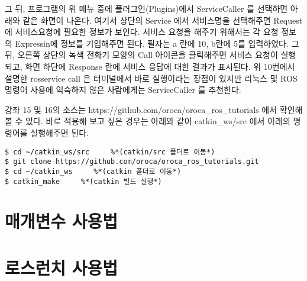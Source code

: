 그 뒤, 프로그램의 위 메뉴 중에 플러그인(Plugins)에서 ServiceCaller 를 선택하면 아래와 같은 화면이 나온다. 여기서 상단의 Service 에서 서비스명을 선택해주면 Request 에 서비스요청에 필요한 정보가 보인다. 서비스 요청을 해주기 위해서는 각 요청 정보의 Expressin에 정보를 기입해주면 된다. 필자는 a 란에 10, b란에 5를 입력하였다. 그 뒤, 오른쪽 상단의 녹색 전화기 모양의 Call 아이콘을 클릭해주면 서비스 요청이 실행되고, 화면 하단에 Response 란에 서비스 응답에 대한 결과가 표시된다. 위 10번에서 설명한 rosservice call 은 터미널에서 바로 실행이라는 장점이 있지만 리눅스 및 ROS 명령어 사용에 익숙하지 않은 사람에게는 ServiceCaller 를 추천한다.

강좌 15 및 16의 소스는 https://github.com/oroca/oroca\_ros\_tutorials 에서 확인해 볼 수 있다. 바로 적용해 보고 싶은 경우는 아래와 같이 catkin\_ws/src 에서 아래의 명령어를 실행해주면 된다.

\begin{lstlisting}[language=ROS]
$ cd ~/catkin_ws/src     %*(catkin/src 폴더로 이동*)
$ git clone https://github.com/oroca/oroca_ros_tutorials.git
$ cd ~/catkin_ws     %*(catkin 폴더로 이동*)
$ catkin_make     %*(catkin 빌드 실행*)

\end{lstlisting}


\section{매개변수 사용법}



\section{로스런치 사용법}


